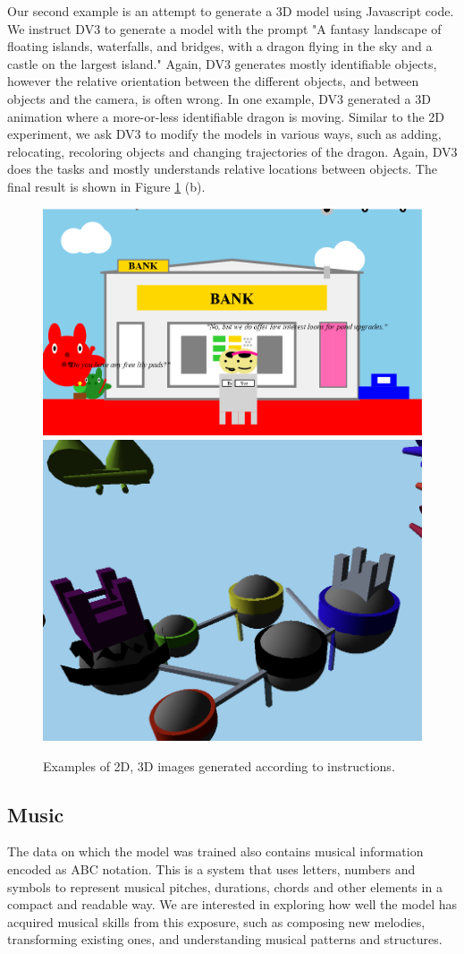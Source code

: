Our second example is an attempt to generate a 3D model using Javascript code. We instruct DV3 to generate a model with the prompt "A fantasy landscape of floating islands, waterfalls, and bridges, with a dragon flying in the sky and a castle on the largest island." Again, DV3 generates mostly identifiable objects, however the relative orientation between the different objects, and between objects and the camera, is often wrong. In one example, DV3 generated a 3D animation where a more-or-less identifiable dragon is moving. Similar to the 2D experiment, we ask DV3 to modify the models in various ways, such as adding, relocating, recoloring objects and changing trajectories of the dragon. Again, DV3 does the tasks and mostly understands relative locations between objects. The final result is shown in Figure \ref{fig:multimodelinstr} (b).

\begin{figure}[ht]
	\centering
	\includegraphics[height=0.3\textwidth]{Section 2/bank.png}
	\hspace{0.5in}
	\includegraphics[height=0.3\textwidth]{Section 2/island.png}
	\caption{Examples of 2D, 3D images generated according to instructions.}
	\label{fig:multimodelinstr}
\end{figure}


\subsection{Music}
The data on which the model was trained also contains musical information encoded as ABC notation. This is a system that uses letters, numbers and symbols to represent musical pitches, durations, chords and other elements in a compact and readable way. We are interested in exploring how well the model has acquired musical skills from this exposure, such as composing new melodies, transforming existing ones, and understanding musical patterns and structures.


